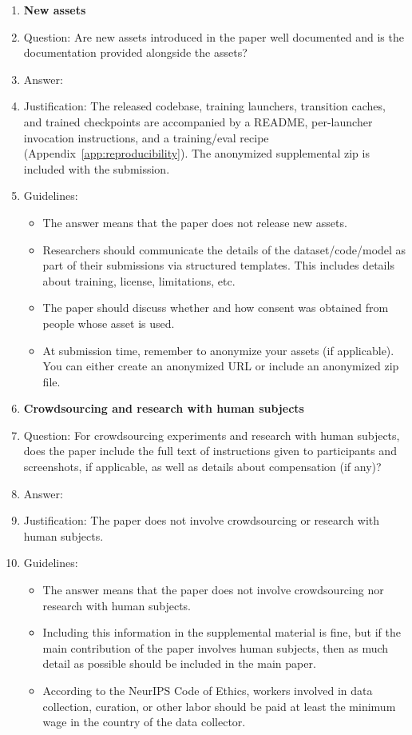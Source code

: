 \begin{enumerate}
\item {\bf New assets}
    \item[] Question: Are new assets introduced in the paper well documented and is the documentation provided alongside the assets?
    \item[] Answer: \answerYes{}
    \item[] Justification: The released codebase, training launchers, transition caches, and trained checkpoints are accompanied by a README, per-launcher invocation instructions, and a training/eval recipe (Appendix~\ref{app:reproducibility}). The anonymized supplemental zip is included with the submission.
    \item[] Guidelines:
    \begin{itemize}
        \item The answer \answerNA{} means that the paper does not release new assets.
        \item Researchers should communicate the details of the dataset\slash code\slash model as part of their submissions via structured templates. This includes details about training, license, limitations, etc.
        \item The paper should discuss whether and how consent was obtained from people whose asset is used.
        \item At submission time, remember to anonymize your assets (if applicable). You can either create an anonymized URL or include an anonymized zip file.
    \end{itemize}

\item {\bf Crowdsourcing and research with human subjects}
    \item[] Question: For crowdsourcing experiments and research with human subjects, does the paper include the full text of instructions given to participants and screenshots, if applicable, as well as details about compensation (if any)?
    \item[] Answer: \answerNA{}
    \item[] Justification: The paper does not involve crowdsourcing or research with human subjects.
    \item[] Guidelines:
    \begin{itemize}
        \item The answer \answerNA{} means that the paper does not involve crowdsourcing nor research with human subjects.
        \item Including this information in the supplemental material is fine, but if the main contribution of the paper involves human subjects, then as much detail as possible should be included in the main paper.
        \item According to the NeurIPS Code of Ethics, workers involved in data collection, curation, or other labor should be paid at least the minimum wage in the country of the data collector.
    \end{itemize}


\end{enumerate}
